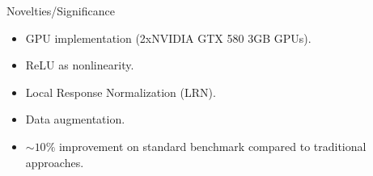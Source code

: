 \documentclass[9pt]{beamer}
\begin{document}
\begin{frame}
\begin{minipage}[t]{0.35\textwidth}
\begin{figure}[t]
		\end{figure}
	\end{minipage}	\hspace{1.5em}
	\pause
	\hspace{1.0em}\begin{minipage}[t]{0.55\textwidth}	
		\vspace{1.5em}
		Novelties/Significance
		\begin{itemize}
			\item \small GPU implementation (2xNVIDIA GTX 580 3GB GPUs).
			\item \small ReLU as nonlinearity.
			\item \small Local Response Normalization (LRN).
			\item \small Data augmentation.
			\item \small $\sim10\%$ improvement on standard benchmark compared to traditional approaches.
		\end{itemize}
	\end{minipage}		
\end{frame}
\end{document}
